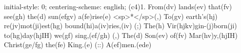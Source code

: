 initial-style: 0;
centering-scheme: english;
(c4)1. From(dv) lands(ev) that(fv) see(gh) the(d) sun(efgv) a(fe)rise(e) <sp>*</sp>(,)
To(gv) earth's(hj) re(jv)mot(ji)est(hg) bound(hi)a(iv)ries,(iv) (;)
The(h) Vir(hjkv)gin-(j)born(ji) to(hg)day(hjIH) we(gf) sing,(ef/gh) (,)
The(d) Son(ev) of(fv) Mar(hv)y,(hjIH) Christ(ge/fg) the(fe) King.(e) (::)
A(ef)men.(ede)
